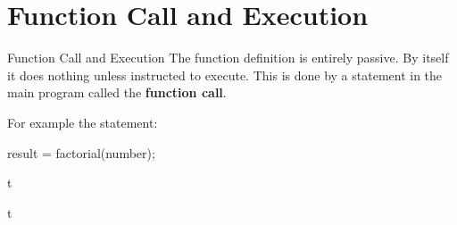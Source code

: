 \documentclass[../lecture4-functions.tex]{subfiles}
\begin{document}
\section{Function Call and Execution}


\begin{frame}[fragile]{Function Call and Execution}
    The function definition is entirely passive. By itself it does nothing unless instructed to execute. This is done by a statement in the main program called the \textbf{function call}. \newline

    For example the statement:
    \begin{cppcode}[lastline = 1, fontsize=\footnotesize]
result = factorial(number);
    \end{cppcode}


\end{frame}


\begin{frame}[fragile]{}
t
\end{frame}


\begin{frame}[fragile]{}
t
\end{frame}

\end{document}
